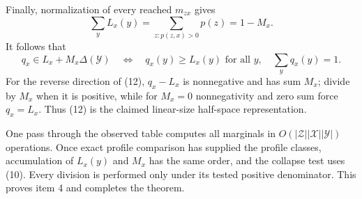 Finally, normalization of every reached \(m_{zx}\) gives
\[
 \sum_yL_x(y)
 =\sum_{z:p(z,x)>0}p(z)=1-M_x.
\tag{11}
\]
It follows that
\[
 q_x\in L_x+M_x\Delta(\mathcal Y)
 \quad\Longleftrightarrow\quad
 q_x(y)\geq L_x(y)\text{ for all }y,
 \quad\sum_yq_x(y)=1.
\tag{12}
\]
For the reverse direction of (12), \(q_x-L_x\) is nonnegative and has
sum \(M_x\); divide by \(M_x\) when it is positive, while for
\(M_x=0\) nonnegativity and zero sum force \(q_x=L_x\).  Thus (12) is
the claimed linear-size half-space representation.

One pass through the observed table computes all marginals in
\(O(|\mathcal Z||\mathcal X||\mathcal Y|)\) operations.  Once exact
profile comparison has supplied the profile classes, accumulation of
\(L_x(y)\) and \(M_x\) has the same order, and the collapse test uses
(10).  Every division is performed only under its tested positive
denominator.  This proves item 4 and completes the theorem.